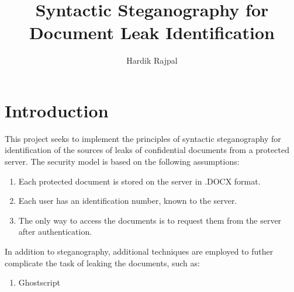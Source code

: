 \documentclass{article}
\author{Hardik Rajpal}
\title{Syntactic Steganography for Document Leak Identification}
\begin{document}
\maketitle
\section{Introduction}
This project seeks to implement the principles of syntactic steganography for identification of the sources of leaks of confidential documents from a protected server. The security model is based on the following assumptions:
\begin{enumerate}
\item Each protected document is stored on the server in .DOCX format.
\item Each user has an identification number, known to the server.
\item The only way to access the documents is to request them from the server after authentication.
\end{enumerate}
In addition to steganography, additional techniques are employed to futher complicate the task of leaking the documents, such as:
\begin{enumerate}
\item Ghostscript 
\end{enumerate}
\end{document}
